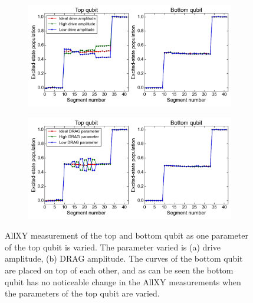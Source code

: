         \begin{figure}
        \centering
           \begin{subfigure}[b]{\textwidth}
           \includegraphics[width=1\linewidth]{Figures/Exploring frequency reuse/AllXY_drive_top.png}
           \caption{}
           \label{fig:AllXY drive top}
        \end{subfigure}

        \begin{subfigure}[b]{\textwidth}
           \includegraphics[width=1\linewidth]{Figures/Exploring frequency reuse/AllXY_drag_top.png}
           \caption{}
           \label{fig:AllXY DRAG top}
        \end{subfigure}

        \caption[Two numerical solutions]{AllXY measurement of the top and bottom qubit as one parameter of the top qubit is varied. The parameter varied is (a) drive amplitude, (b) DRAG amplitude. The curves of the bottom qubit are placed on top of each other, and as can be seen the bottom qubit has no noticeable change in the AllXY measurements when the parameters of the top qubit are varied.}
        \label{fig:AllXY individual control}
        \end{figure}

